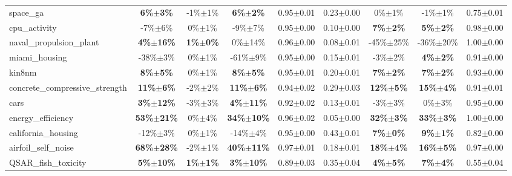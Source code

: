 \begin{table}[t]
\begin{small}
\begin{sc}
{\begin{tabular}{lcccccccc}
space\_ga  &  \textbf{6\%$\pm$3\%}  &  -1\%$\pm$1\%  &  \textbf{6\%$\pm$2\%}  &  0.95$\pm$0.01  &  0.23$\pm$0.00  &  0\%$\pm$1\%  &  -1\%$\pm$1\%  &  0.75$\pm$0.01 \\
cpu\_activity  &  -7\%$\pm$6\%  &  0\%$\pm$1\%  &  -9\%$\pm$7\%  &  0.95$\pm$0.00  &  0.10$\pm$0.00  &  \textbf{7\%$\pm$2\%}  &  \textbf{5\%$\pm$2\%}  &  0.98$\pm$0.00 \\
naval\_propulsion\_plant  &  \textbf{4\%$\pm$16\%}  &  \textbf{1\%$\pm$0\%}  &  0\%$\pm$14\%  &  0.96$\pm$0.00  &  0.08$\pm$0.01  &  -45\%$\pm$25\%  &  -36\%$\pm$20\%  &  1.00$\pm$0.00 \\
miami\_housing  &  -38\%$\pm$3\%  &  0\%$\pm$1\%  &  -61\%$\pm$9\%  &  0.95$\pm$0.00  &  0.15$\pm$0.01  &  -3\%$\pm$2\%  &  \textbf{4\%$\pm$2\%}  &  0.91$\pm$0.00 \\
kin8nm  &  \textbf{8\%$\pm$5\%}  &  0\%$\pm$1\%  &  \textbf{8\%$\pm$5\%}  &  0.95$\pm$0.01  &  0.20$\pm$0.01  &  \textbf{7\%$\pm$2\%}  &  \textbf{7\%$\pm$2\%}  &  0.93$\pm$0.00 \\
concrete\_compressive\_strength  &  \textbf{11\%$\pm$6\%}  &  -2\%$\pm$2\%  &  \textbf{11\%$\pm$6\%}  &  0.94$\pm$0.02  &  0.29$\pm$0.03  &  \textbf{12\%$\pm$5\%}  &  \textbf{15\%$\pm$4\%}  &  0.91$\pm$0.01 \\
cars  &  \textbf{3\%$\pm$12\%}  &  -3\%$\pm$3\%  &  \textbf{4\%$\pm$11\%}  &  0.92$\pm$0.02  &  0.13$\pm$0.01  &  -3\%$\pm$3\%  &  0\%$\pm$3\%  &  0.95$\pm$0.00 \\
energy\_efficiency  &  \textbf{53\%$\pm$21\%}  &  0\%$\pm$4\%  &  \textbf{34\%$\pm$10\%}  &  0.96$\pm$0.02  &  0.05$\pm$0.00  &  \textbf{32\%$\pm$3\%}  &  \textbf{33\%$\pm$3\%}  &  1.00$\pm$0.00 \\
california\_housing  &  -12\%$\pm$3\%  &  0\%$\pm$1\%  &  -14\%$\pm$4\%  &  0.95$\pm$0.00  &  0.43$\pm$0.01  &  \textbf{7\%$\pm$0\%}  &  \textbf{9\%$\pm$1\%}  &  0.82$\pm$0.00 \\
airfoil\_self\_noise  &  \textbf{68\%$\pm$28\%}  &  -2\%$\pm$1\%  &  \textbf{40\%$\pm$11\%}  &  0.97$\pm$0.01  &  0.18$\pm$0.01  &  \textbf{18\%$\pm$4\%}  &  \textbf{16\%$\pm$5\%}  &  0.97$\pm$0.00 \\
QSAR\_fish\_toxicity  &  \textbf{5\%$\pm$10\%}  &  \textbf{1\%$\pm$1\%}  &  \textbf{3\%$\pm$10\%}  &  0.89$\pm$0.03  &  0.35$\pm$0.04  &  \textbf{4\%$\pm$5\%}  &  \textbf{7\%$\pm$4\%}  &  0.55$\pm$0.04 \\

\bottomrule
\end{tabular}
}
\end{sc}
\end{small}
\end{table}
